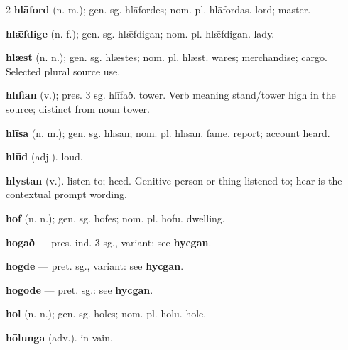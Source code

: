 \begin{multicols*}{2}
\textbf{hlāford} (n. m.); gen. sg. hlāfordes; nom. pl. hlāfordas. lord; master.\par
\textbf{hlǣfdige} (n. f.); gen. sg. hlǣfdigan; nom. pl. hlǣfdigan. lady.\par
\textbf{hlæst} (n. n.); gen. sg. hlæstes; nom. pl. hlæst. wares; merchandise; cargo. Selected plural source use.\par
\textbf{hlīfian} (v.); pres. 3 sg. hlīfað. tower. Verb meaning stand/tower high in the source; distinct from noun tower.\par
\textbf{hlīsa} (n. m.); gen. sg. hlīsan; nom. pl. hlīsan. fame. report; account heard.\par
\textbf{hlūd} (adj.). loud.\par
\textbf{hlystan} (v.). listen to; heed. Genitive person or thing listened to; hear is the contextual prompt wording.\par
\textbf{hof} (n. n.); gen. sg. hofes; nom. pl. hofu. dwelling.\par
\textbf{hogað} — pres. ind. 3 sg., variant: see \textbf{hycgan}.\par
\textbf{hogde} — pret. sg., variant: see \textbf{hycgan}.\par
\textbf{hogode} — pret. sg.: see \textbf{hycgan}.\par
\textbf{hol} (n. n.); gen. sg. holes; nom. pl. holu. hole.\par
\textbf{hōlunga} (adv.). in vain.\par

\end{multicols*}
